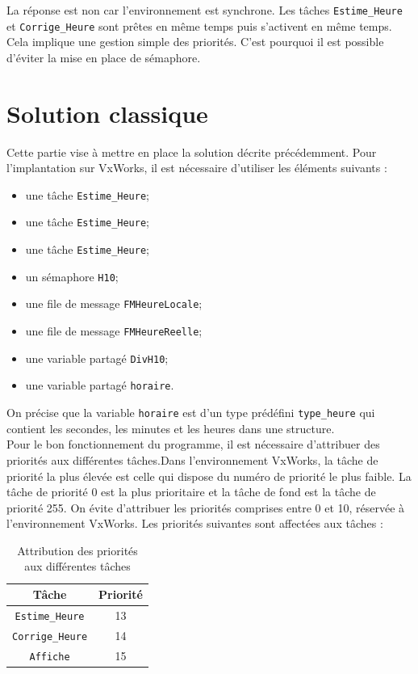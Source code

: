 \documentclass[french]{article}
\begin{document}
	La réponse est non car l'environnement est synchrone. Les tâches \texttt{Estime\_Heure} et \texttt{Corrige\_Heure} sont prêtes en même temps puis s'activent en même temps. Cela implique une gestion simple des priorités. C'est pourquoi il est possible d'éviter la mise en place de sémaphore.\\
	
	
	
	\section{Solution classique}
	
	Cette partie vise à mettre en place la solution décrite précédemment. Pour l'implantation sur VxWorks, il est nécessaire d'utiliser les éléments suivants :
	\begin{itemize}
		\item une tâche \texttt{Estime\_Heure};
		\item une tâche \texttt{Estime\_Heure};
		\item une tâche \texttt{Estime\_Heure};
		\item un sémaphore \texttt{H10};
		\item une file de message \texttt{FMHeureLocale};
		\item une file de message \texttt{FMHeureReelle};
		\item une variable partagé \texttt{DivH10};
		\item une variable partagé \texttt{horaire}.		
	\end{itemize}
	
	On précise que la variable \texttt{horaire} est d'un type prédéfini \texttt{type\_heure} qui contient les secondes, les minutes et les heures dans une structure.\\
	
	Pour le bon fonctionnement du programme, il est nécessaire d'attribuer des priorités aux différentes tâches.Dans l’environnement	VxWorks, la tâche de priorité la plus élevée est celle qui dispose du numéro de priorité le plus faible. La tâche de priorité 0 est la plus prioritaire et la tâche de fond est la tâche de priorité 255. On évite d’attribuer les priorités comprises entre 0 et 10, réservée à l’environnement VxWorks. Les priorités suivantes sont affectées aux tâches :
	
	\begin{table}[H]
		\centering
		\begin{tabular}{|c|c|}
			\hline
			Tâche & Priorité \\
			\hline
			\texttt{Estime\_Heure} & 13 \\
			\hline
			\texttt{Corrige\_Heure} & 14 \\
			\hline
			\texttt{Affiche} & 15 \\
			\hline
		\end{tabular}
		\caption{Attribution des priorités aux différentes tâches}
		\label{tab:priorite_taches}
	\end{table}
	
\end{document}
